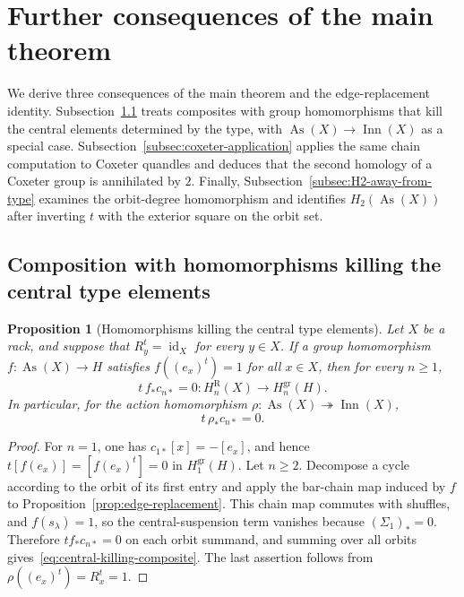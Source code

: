 \documentclass[10pt,a4paper]{amsart}
\newtheorem{proposition}[theorem]{Proposition}
\DeclareMathOperator{\As}{As}
\DeclareMathOperator{\Inn}{Inn}
\newcommand{\gr}{\mathrm{gr}}
\newcommand{\R}{\mathrm R}
\begin{document}
\section{Further consequences of the main theorem}

We derive three consequences of the main theorem and the edge-replacement
identity. Subsection~\ref{subsec:central-killing-composite} treats composites
with group homomorphisms that kill the central elements determined by the
type, with $\As(X)\to\Inn(X)$ as a special case.
Subsection~\ref{subsec:coxeter-application} applies the same chain computation
to Coxeter quandles and deduces that the second homology of a Coxeter group is
annihilated by $2$. Finally, Subsection~\ref{subsec:H2-away-from-type}
examines the orbit-degree homomorphism and identifies $H_2(\As(X))$ after
inverting $t$ with the exterior square on the orbit set.

\subsection{Composition with homomorphisms killing the central type elements}
\label{subsec:central-killing-composite}

\begin{proposition}[Homomorphisms killing the central type elements]
\label{prop:central-killing-composite}
Let $X$ be a rack, and suppose that
$R_y^t=\operatorname{id}_X$ for every $y\in X$. If a group homomorphism
$f\colon\As(X)\to H$ satisfies
$f((e_x)^t)=1$ for all $x\in X$, then for every $n\ge1$,
\begin{equation}
 t\,f_*c_{n*}=0
 \colon H_n^\R(X)\longrightarrow H_n^{\gr}(H).
 \label{eq:central-killing-composite}
\end{equation}
In particular, for the action homomorphism
$\rho\colon\As(X)\twoheadrightarrow\Inn(X)$,
\[
 t\,\rho_*c_{n*}=0.
\]
\end{proposition}

\begin{proof}
For $n=1$, one has $c_{1*}[x]=-[e_x]$, and hence
$t[f(e_x)]=[f(e_x)^t]=0$ in $H_1^{\gr}(H)$. Let $n\ge2$. Decompose a cycle according to the
orbit of its first entry and apply the bar-chain map induced by $f$ to Proposition~\ref{prop:edge-replacement}. This chain map commutes with shuffles, and
$f(s_\lambda)=1$, so the central-suspension term vanishes because
$(\Sigma_1)_*=0$. Therefore $t f_*c_{n*}=0$ on each orbit summand, and summing
over all orbits gives~\eqref{eq:central-killing-composite}. The last assertion
follows from $\rho((e_x)^t)=R_x^t=1$.
\end{proof}
\end{document}
